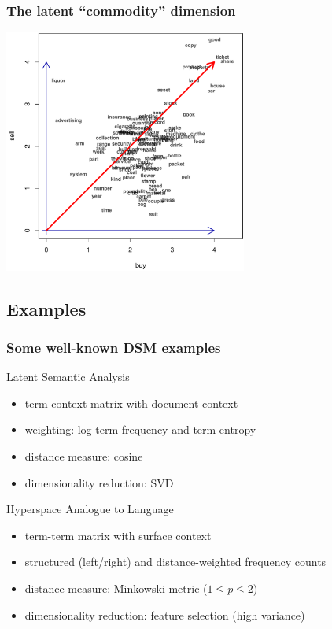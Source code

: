 \begin{frame}[c]
  \frametitle{The latent ``commodity'' dimension}
  \begin{center}
    \ungap[1]
    \includegraphics[width=8cm]{img/3_buy_sell_labels_latent}
  \end{center}
\end{frame}


\subsection{Examples}

\begin{frame}
  \frametitle{Some well-known DSM examples}

  \ungap
  \begin{block} {Latent Semantic Analysis \citep{Landauer:Dumais:97}}
  \begin{itemize}
  \item term-context matrix with document context
  \item weighting: log term frequency and term entropy
  \item distance measure: cosine
  \item dimensionality reduction: SVD
  \end{itemize}
  \end{block}
 
 \begin{block} {Hyperspace Analogue to Language \citep{Lund:Burgess:96}}
  \begin{itemize}
  \item term-term matrix with surface context
  \item structured (left/right) and distance-weighted frequency counts
  \item distance measure: Minkowski metric ($1\leq p \leq 2$)
  \item dimensionality reduction: feature selection (high variance)
  \end{itemize}
  \end{block}
\end{frame}

